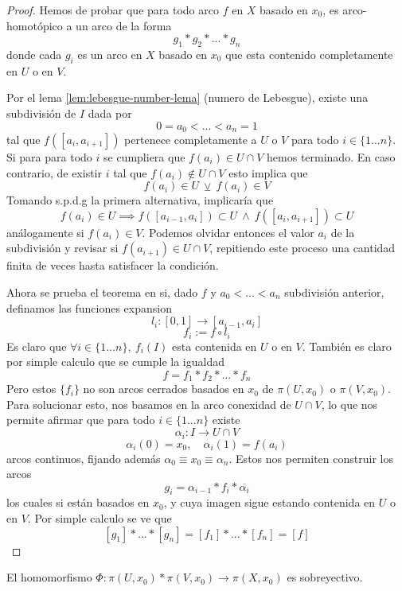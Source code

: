 \begin{proof}
  Hemos de probar que para todo arco \(f\) en \(X\) basado en \(x_0\),
  es arco-homotópico a un arco de la forma
  \[ g_1 * g_2 * ... * g_n \]
  donde cada \(g_i\) es un arco en \(X\) basado en \(x_0\) que esta
  contenido completamente en \(U\) o en \(V\).

  Por el lema \ref{lem:lebesgue-number-lema} (numero de Lebesgue),
  existe una subdivisión de \(I\) dada por
  \[ 0 = a_0 < ... < a_n = 1\]
  tal que
  \(f ([a_i , a_{i+1}])\) pertenece completamente a \(U\) o \(V\) para
  todo \(i \in \{1 \dotsc n\}\). Si para para todo \(i\) se cumpliera que
  \(f(a_i) \in U \cap V\) hemos terminado. En caso contrario, de existir
  \(i\) tal que \(f(a_i) \not \in U \cap V\) esto implica que
  \[ f(a_i) \in U \ \veebar \ f(a_i) \in V \]
  Tomando s.p.d.g la primera alternativa, implicaría que
  \[ f(a_i) \in U \implies f([a_{i-1}, a_{i}]) \subset U \ \land \ f([a_i,
    a_{i+1}]) \subset U \]
  análogamente si \(f(a_i) \in V\). Podemos olvidar entonces el valor
  \(a_i\) de la subdivisión y revisar si \(f(a_{i+1}) \in U \cap V\),
  repitiendo este proceso una cantidad finita de veces hasta satisfacer
  la condición.

  Ahora se prueba el teorema en si, dado \(f\) y \(a_0 < \dotsc < a_n\)
  subdivisión anterior, definamos las funciones expansion
  \[ l_i : [0,1] \to [a_{i-1}, a_{i}] \]
  \[ f_i := f \circ l_i \]
  Es claro que \(\forall i \in \{1 \dotsc n\}, \ f_i (I) \) esta contenida en
  \(U\) o en \(V\). También es claro por simple calculo que se cumple
  la igualdad
  \[ f = f_1 * f_2 * ... * f_n \]
  Pero estos \(\{f_i\}\) no son arcos cerrados basados en \(x_0\) de
  \(\pi (U,x_0)\) o \(\pi (V,x_0)\). Para solucionar esto, nos basamos
  en la arco conexidad de \(U \cap V\), lo que nos permite afirmar que
  para todo \(i \in \{1 \dotsc n\}\) existe
  \[ \alpha_i : I \to U \cap V \]
  \[ \alpha_i (0) = x_0, \quad \alpha_i (1) = f(a_i) \]
  arcos continuos, fijando además \(\alpha_0 \equiv x_0 \equiv \alpha_n
  \). Estos nos permiten construir los arcos
  \[ g_i = \alpha_{i-1} * f_i * \overline{\alpha_i} \]
  los cuales si están basados en \(x_0\), y cuya imagen sigue estando
  contenida en \(U\) o en \(V\). Por simple calculo se ve que
  \[ [g_1] * ... * [g_n] = [f_1] * ... * [f_n] = [f] \]
\end{proof}
\begin{corolario}\label{cor:sobre-van}
  El homomorfismo \(\Phi : \pi (U, x_0) * \pi (V, x_0) \to \pi (X,
  x_0)\) es sobreyectivo.
\end{corolario}
